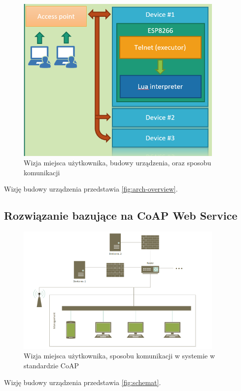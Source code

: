\begin{figure}[!htbp]
	\centering
	\includegraphics[width=0.9\textwidth]{images/fig01-arch-overview.png}
	\caption[Wizja architektury systemu.]{Wizja miejsca użytkownika, budowy urządzenia, oraz sposobu komunikacji}
	\label{fig:arch-overview}
\end{figure}

Wizję budowy urządzenia przedstawia \autoref{fig:arch-overview}.

\subsection{Rozwiązanie bazujące na CoAP Web Service}

\begin{figure}[!htbp]
	\centering
	\includegraphics[width=0.9\textwidth]{images/schemat.png}
	\caption[Wizja architektury systemu w standardzie CoAP.]{Wizja miejsca użytkownika, sposobu komunikacji w systemie w standardzie CoAP}
	\label{fig:schemat}
\end{figure}
Wizję budowy urządzenia przedstawia \autoref{fig:schemat}.

